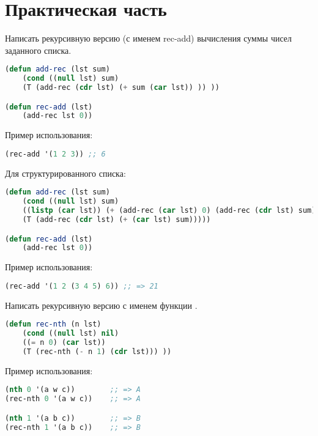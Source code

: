 \documentclass[a4paper,oneside,12pt]{extreport}
\begin{document}


\section*{Практическая часть}

\begin{task}
    Написать рекурсивную версию (с именем rec-add) вычисления суммы чисел заданного списка.

    \begin{lstlisting}[language=Lisp]
(defun add-rec (lst sum)
    (cond ((null lst) sum)
    (T (add-rec (cdr lst) (+ sum (car lst)) )) ))

(defun rec-add (lst)
	(add-rec lst 0))
    \end{lstlisting}

    Пример использования:
    \begin{lstlisting}[language=Lisp] 
(rec-add '(1 2 3)) ;; 6
    \end{lstlisting}

    Для структурированного списка:
    \begin{lstlisting}[language=Lisp]
(defun add-rec (lst sum)
    (cond ((null lst) sum) 
    ((listp (car lst)) (+ (add-rec (car lst) 0) (add-rec (cdr lst) sum)))
    (T (add-rec (cdr lst) (+ (car lst) sum)))))

(defun rec-add (lst)
    (add-rec lst 0))
    \end{lstlisting}

    Пример использования:
    \begin{lstlisting}[language=Lisp] 
(rec-add '(1 2 (3 4 5) 6)) ;; => 21
    \end{lstlisting}
\end{task}

\begin{task}
	Написать рекурсивную версию с именем  функции .

    \begin{lstlisting}[language=Lisp]
(defun rec-nth (n lst)
	(cond ((null lst) nil)
	((= n 0) (car lst))
	(T (rec-nth (- n 1) (cdr lst))) ))
    \end{lstlisting}

    Пример использования:
    \begin{lstlisting}[language=Lisp] 
(nth 0 '(a w c))        ;; => A
(rec-nth 0 '(a w c))    ;; => A

(nth 1 '(a b c))        ;; => B
(rec-nth 1 '(a b c))    ;; => B
    \end{lstlisting}
\end{task}
\end{document}
